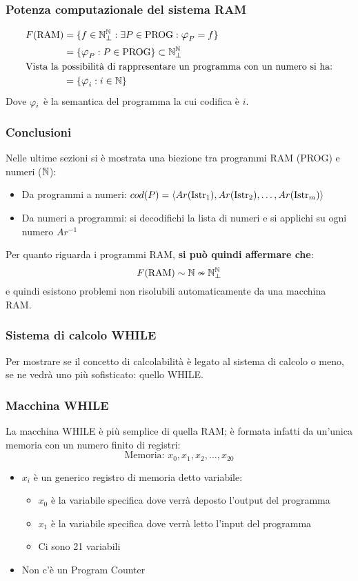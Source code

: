 \subsubsection*{Potenza computazionale del sistema RAM}
$$ \begin{aligned}
        F(\RAM) &= \{f\in\N_\perp^\N:\exists P \in \PROG: \semRAM_P=f\}\\
                &= \{\semRAM_P:P\in\PROG\} \subset \N_\perp^\N \\
                \multispan2{Vista la possibilità di rappresentare un programma
                 con un numero si ha:\hfill}\notag\\
                 &= \{\semRAM_i:i\in\N\}
\end{aligned} $$
Dove $\semRAM_i$ è la semantica del programma la cui codifica è $i$.
\subsubsection*{Conclusioni}
Nelle ultime sezioni si è mostrata una biezione tra programmi RAM (PROG) e numeri
($\mathbb{N}$):
    \begin{itemize}
        \item Da programmi a numeri:
            $cod(P)=\langle Ar(\text{Istr}_1),Ar(\text{Istr}_2),\dots,Ar(\text{Istr}_m)\rangle$
        \item Da numeri a programmi: si decodifichi la lista di numeri e si applichi su
            ogni numero $Ar^{-1}$
    \end{itemize}
Per quanto riguarda i programmi RAM, \textbf{si può quindi affermare che}:
$$ F(\text{RAM}) \sim \mathbb{N} \nsim \mathbb{N}^{\mathbb{N}}_\perp $$
e quindi esistono problemi non risolubili automaticamente da una macchina RAM.
\subsubsection{Sistema di calcolo WHILE}
Per mostrare se il concetto di calcolabilità è legato al sistema di calcolo o meno,
se ne vedrà uno più sofisticato: quello WHILE.
\subsubsection*{Macchina WHILE}
La macchina WHILE è più semplice di quella RAM; è formata infatti da un'unica memoria
con un numero finito di registri:
$$\text{Memoria: } x_0,x_1,x_2,\dots,x_{20}$$
\begin{itemize}
    \item $x_i$ è un generico registro di memoria detto variabile:
        \begin{itemize}
            \item $x_0$ è la variabile specifica dove verrà deposto l'output del programma
            \item $x_1$ è la variabile specifica dove verrà letto l'input del programma
            \item Ci sono 21 variabili
        \end{itemize}
    \item Non c'è un Program Counter
\end{itemize}

